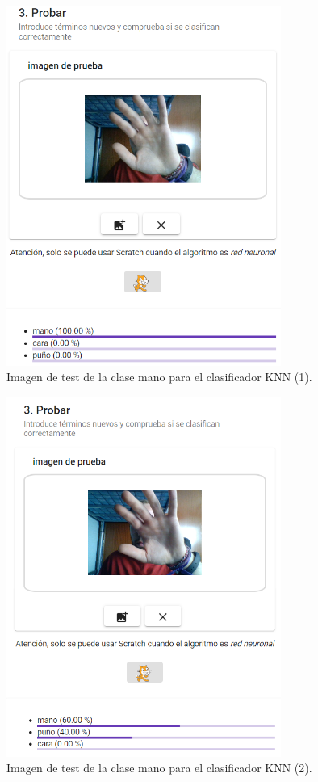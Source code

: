 \documentclass[a4paper, 12pt]{book}
\begin{document}
\begin{figure}
	\centering
	\includegraphics[width=9cm, keepaspectratio]{img/testmanoknnbien}
	\caption{Imagen de test de la clase mano para el clasificador KNN (1).}			
	\label{fig:testmanoknnbien}
\end{figure}

\begin{figure}
	\centering
	\includegraphics[width=9cm, keepaspectratio]{img/testmanoknnmal}
	\caption{Imagen de test de la clase mano para el clasificador KNN (2).}			
	\label{fig:testmanoknnmal}
\end{figure}
\end{document}

